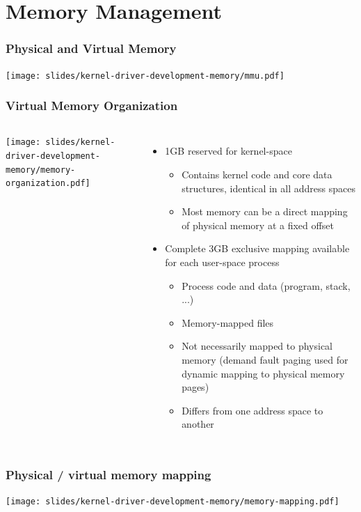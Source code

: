 \section{Memory Management}

\begin{frame}
  \frametitle{Physical and Virtual Memory}
  \begin{center}
    \texttt{[image: slides/kernel-driver-development-memory/mmu.pdf]}
  \end{center}
\end{frame}

\begin{frame}
  \frametitle{Virtual Memory Organization}
  \begin{columns}
    \texttt{[image: slides/kernel-driver-development-memory/memory-organization.pdf]}
    \begin{itemize}
    \item 1GB reserved for kernel-space
      \begin{itemize}
      \item Contains kernel code and core data structures, identical
        in all address spaces
      \item Most memory can be a direct mapping of physical memory at
        a fixed offset
      \end{itemize}
    \item Complete 3GB exclusive mapping available for each user-space
      process
      \begin{itemize}
      \item Process code and data (program, stack, ...)
      \item Memory-mapped files
      \item Not necessarily mapped to physical memory (demand fault
        paging used for dynamic mapping to physical memory pages)
      \item Differs from one address space to another
      \end{itemize}
    \end{itemize}
  \end{columns}
\end{frame}

\begin{frame}
  \frametitle{Physical / virtual memory mapping}
  \begin{center}
    \texttt{[image: slides/kernel-driver-development-memory/memory-mapping.pdf]}
  \end{center}
\end{frame}


